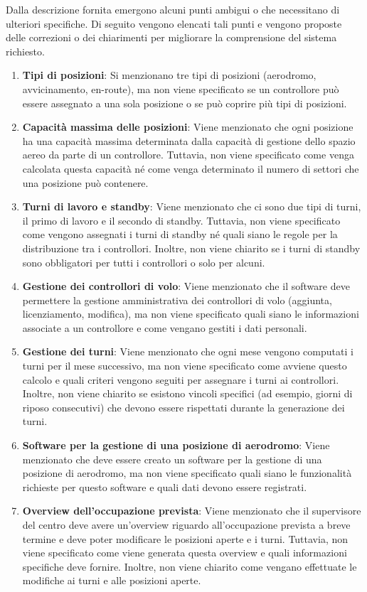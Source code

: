 Dalla descrizione fornita emergono alcuni punti ambigui o che necessitano di ulteriori specifiche. Di seguito vengono elencati tali punti e vengono proposte delle correzioni o dei chiarimenti per migliorare la comprensione del sistema richiesto.

\begin{enumerate} 
  \item \textbf{Tipi di posizioni}: Si menzionano tre tipi di posizioni (aerodromo, avvicinamento, en-route), ma non viene specificato se un controllore può essere assegnato a una sola posizione o se può coprire più tipi di posizioni.
  
  \item \textbf{Capacità massima delle posizioni}: Viene menzionato che ogni posizione ha una capacità massima determinata dalla capacità di gestione dello spazio aereo da parte di un controllore. Tuttavia, non viene specificato come venga calcolata questa capacità né come venga determinato il numero di settori che una posizione può contenere.
  
  \item \textbf{Turni di lavoro e standby}: Viene menzionato che ci sono due tipi di turni, il primo di lavoro e il secondo di standby. Tuttavia, non viene specificato come vengono assegnati i turni di standby né quali siano le regole per la distribuzione tra i controllori. Inoltre, non viene chiarito se i turni di standby sono obbligatori per tutti i controllori o solo per alcuni.
    
  \item \textbf{Gestione dei controllori di volo}: Viene menzionato che il software deve permettere la gestione amministrativa dei controllori di volo (aggiunta, licenziamento, modifica), ma non viene specificato quali siano le informazioni associate a un controllore e come vengano gestiti i dati personali.
  
  \item \textbf{Gestione dei turni}: Viene menzionato che ogni mese vengono computati i turni per il mese successivo, ma non viene specificato come avviene questo calcolo e quali criteri vengono seguiti per assegnare i turni ai controllori. Inoltre, non viene chiarito se esistono vincoli specifici (ad esempio, giorni di riposo consecutivi) che devono essere rispettati durante la generazione dei turni.
  
  \item \textbf{Software per la gestione di una posizione di aerodromo}: Viene menzionato che deve essere creato un software per la gestione di una posizione di aerodromo, ma non viene specificato quali siano le funzionalità richieste per questo software e quali dati devono essere registrati.
  
  \item \textbf{Overview dell'occupazione prevista}: Viene menzionato che il supervisore del centro deve avere un'overview riguardo all'occupazione prevista a breve termine e deve poter modificare le posizioni aperte e i turni. Tuttavia, non viene specificato come viene generata questa overview e quali informazioni specifiche deve fornire. Inoltre, non viene chiarito come vengano effettuate le modifiche ai turni e alle posizioni aperte.
  \end{enumerate}


